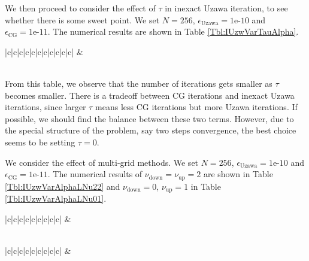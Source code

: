 \documentclass[english, nochinese]{pnote}
\begin{document}
We then proceed to consider the effect of $\tau$ in inexact Uzawa iteration, to see whether there is some sweet point. We set $ N = 256 $, $ \epsilon_{\text{Uzawa}} = \text{1e-10} $ and $ \epsilon_{\text{CG}} = \text{1e-11} $. The numerical results are shown in Table \ref{Tbl:IUzwVarTauAlpha}.

\begin{table}[htbp]
\centering
\begin{tabular}{|c|c|c|c|c|c|c|c|c|c|c|}
\hline
{} &  \\
  \\
\hline

\end{tabular}
\caption{Effect of $\tau$ for inexact Uzawa iterations with CG approximation}
\label{Tbl:IUzwVarTauAlpha}
\end{table}

From this table, we observe that the number of iterations gets smaller as $\tau$ becomes smaller. There is a tradeoff between CG iterations and inexact Uzawa iterations, since larger $\tau$ means less CG iterations but more Uzawa iterations. If possible, we should find the balance between these two terms. However, due to the special structure of the problem, say two steps convergence, the best choice seems to be setting $ \tau = 0 $.

We consider the effect of multi-grid methods. We set $ N = 256 $, $ \epsilon_{\text{Uzawa}} = \text{1e-10} $ and $ \epsilon_{\text{CG}} = \text{1e-11} $. The numerical results of $ \nu_{\text{down}} = \nu_{\text{up}} = 2 $ are shown in Table \ref{Tbl:IUzwVarAlphaLNu22} and $ \nu_{\text{down}} = 0 $, $ \nu_{\text{up}} = 1 $ in Table \ref{Tbl:IUzwVarAlphaLNu01}.

\begin{table}[htbp]
\centering
\begin{tabular}{|c|c|c|c|c|c|c|c|c|}
\hline
{} &  \\
  \\
\hline

\end{tabular}
\caption{Effect of multi-grid methods when $ \nu_{\text{down}} = \nu_{\text{up}} = 2 $ for inexact Uzawa iterations with CG approximation}
\label{Tbl:IUzwVarAlphaLNu22}
\end{table}

\begin{table}[htbp]
\centering
\begin{tabular}{|c|c|c|c|c|c|c|c|c|}
\hline
{} &  \\
  \\
\hline

\end{tabular}
\caption{Effect of multi-grid methods when $ \nu_{\text{down}} = 0 $, $ \nu_{\text{up}} = 1 $ for inexact Uzawa iterations with CG approximation}
\label{Tbl:IUzwVarAlphaLNu01}
\end{table}
\end{document}

